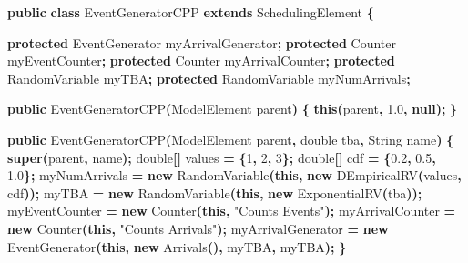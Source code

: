 \documentclass[
]{book}
\newenvironment{Shaded}{\begin{snugshade}}{\end{snugshade}}
\newcommand{\BuiltInTok}[1]{#1}
\newcommand{\DataTypeTok}[1]{\textcolor[rgb]{0.13,0.29,0.53}{#1}}
\newcommand{\DecValTok}[1]{\textcolor[rgb]{0.00,0.00,0.81}{#1}}
\newcommand{\FloatTok}[1]{\textcolor[rgb]{0.00,0.00,0.81}{#1}}
\newcommand{\FunctionTok}[1]{\textcolor[rgb]{0.00,0.00,0.00}{#1}}
\newcommand{\KeywordTok}[1]{\textcolor[rgb]{0.13,0.29,0.53}{\textbf{#1}}}
\newcommand{\NormalTok}[1]{#1}
\newcommand{\OperatorTok}[1]{\textcolor[rgb]{0.81,0.36,0.00}{\textbf{#1}}}
\newcommand{\StringTok}[1]{\textcolor[rgb]{0.31,0.60,0.02}{#1}}
\theoremstyle{definition}
\theoremstyle{definition}
\theoremstyle{definition}
\theoremstyle{definition}
\theoremstyle{remark}
\begin{document}
\begin{Shaded}
\begin{Highlighting}[]
\KeywordTok{public} \KeywordTok{class}\NormalTok{ EventGeneratorCPP }\KeywordTok{extends}\NormalTok{ SchedulingElement }\OperatorTok{\{}

    \KeywordTok{protected}\NormalTok{ EventGenerator myArrivalGenerator}\OperatorTok{;}
    \KeywordTok{protected}\NormalTok{ Counter myEventCounter}\OperatorTok{;}
    \KeywordTok{protected}\NormalTok{ Counter myArrivalCounter}\OperatorTok{;}
    \KeywordTok{protected}\NormalTok{ RandomVariable myTBA}\OperatorTok{;}
    \KeywordTok{protected}\NormalTok{ RandomVariable myNumArrivals}\OperatorTok{;}

    \KeywordTok{public} \FunctionTok{EventGeneratorCPP}\OperatorTok{(}\NormalTok{ModelElement parent}\OperatorTok{)} \OperatorTok{\{}
        \KeywordTok{this}\OperatorTok{(}\NormalTok{parent}\OperatorTok{,} \FloatTok{1.0}\OperatorTok{,} \KeywordTok{null}\OperatorTok{);}
    \OperatorTok{\}}

    \KeywordTok{public} \FunctionTok{EventGeneratorCPP}\OperatorTok{(}\NormalTok{ModelElement parent}\OperatorTok{,} \DataTypeTok{double}\NormalTok{ tba}\OperatorTok{,} \BuiltInTok{String}\NormalTok{ name}\OperatorTok{)} \OperatorTok{\{}
        \KeywordTok{super}\OperatorTok{(}\NormalTok{parent}\OperatorTok{,}\NormalTok{ name}\OperatorTok{);}
        \DataTypeTok{double}\OperatorTok{[]}\NormalTok{ values }\OperatorTok{=} \OperatorTok{\{}\DecValTok{1}\OperatorTok{,} \DecValTok{2}\OperatorTok{,} \DecValTok{3}\OperatorTok{\};}
        \DataTypeTok{double}\OperatorTok{[]}\NormalTok{ cdf }\OperatorTok{=} \OperatorTok{\{}\FloatTok{0.2}\OperatorTok{,} \FloatTok{0.5}\OperatorTok{,} \FloatTok{1.0}\OperatorTok{\};}
\NormalTok{        myNumArrivals }\OperatorTok{=} \KeywordTok{new} \FunctionTok{RandomVariable}\OperatorTok{(}\KeywordTok{this}\OperatorTok{,} \KeywordTok{new} \FunctionTok{DEmpiricalRV}\OperatorTok{(}\NormalTok{values}\OperatorTok{,}\NormalTok{ cdf}\OperatorTok{));}
\NormalTok{        myTBA }\OperatorTok{=} \KeywordTok{new} \FunctionTok{RandomVariable}\OperatorTok{(}\KeywordTok{this}\OperatorTok{,} \KeywordTok{new} \FunctionTok{ExponentialRV}\OperatorTok{(}\NormalTok{tba}\OperatorTok{));}
\NormalTok{        myEventCounter }\OperatorTok{=} \KeywordTok{new} \FunctionTok{Counter}\OperatorTok{(}\KeywordTok{this}\OperatorTok{,} \StringTok{"Counts Events"}\OperatorTok{);}
\NormalTok{        myArrivalCounter }\OperatorTok{=} \KeywordTok{new} \FunctionTok{Counter}\OperatorTok{(}\KeywordTok{this}\OperatorTok{,} \StringTok{"Counts Arrivals"}\OperatorTok{);}
\NormalTok{        myArrivalGenerator }\OperatorTok{=} \KeywordTok{new} \FunctionTok{EventGenerator}\OperatorTok{(}\KeywordTok{this}\OperatorTok{,} \KeywordTok{new} \FunctionTok{Arrivals}\OperatorTok{(),}\NormalTok{ myTBA}\OperatorTok{,}\NormalTok{ myTBA}\OperatorTok{);}
    \OperatorTok{\}}


\end{Highlighting}
\end{Shaded}
\end{document}
